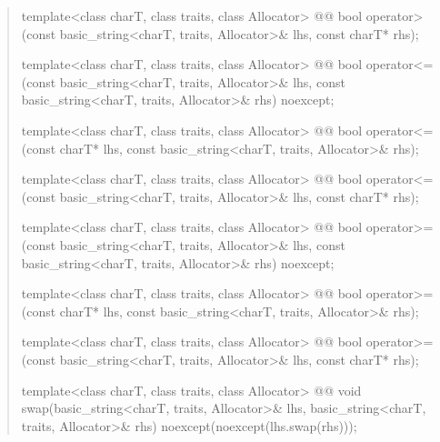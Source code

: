 \documentclass{wg21}
\begin{document}
\begin{quote}
\begin{itemdecl}
template<class charT, class traits, class Allocator>
  @@
  bool operator>(const basic_string<charT, traits, Allocator>& lhs, const charT* rhs);
\end{itemdecl}

\begin{itemdecl}
template<class charT, class traits, class Allocator>
  @@
  bool operator<=(const basic_string<charT, traits, Allocator>& lhs,
                  const basic_string<charT, traits, Allocator>& rhs) noexcept;
\end{itemdecl}

\begin{itemdecl}
template<class charT, class traits, class Allocator>
  @@
  bool operator<=(const charT* lhs, const basic_string<charT, traits, Allocator>& rhs);
\end{itemdecl}

\begin{itemdecl}
template<class charT, class traits, class Allocator>
  @@
  bool operator<=(const basic_string<charT, traits, Allocator>& lhs, const charT* rhs);
\end{itemdecl}

\begin{itemdecl}
template<class charT, class traits, class Allocator>
  @@
  bool operator>=(const basic_string<charT, traits, Allocator>& lhs,
                  const basic_string<charT, traits, Allocator>& rhs) noexcept;
\end{itemdecl}

\begin{itemdecl}
template<class charT, class traits, class Allocator>
  @@
  bool operator>=(const charT* lhs, const basic_string<charT, traits, Allocator>& rhs);
\end{itemdecl}

\begin{itemdecl}
template<class charT, class traits, class Allocator>
  @@
  bool operator>=(const basic_string<charT, traits, Allocator>& lhs, const charT* rhs);
\end{itemdecl}

\begin{itemdecl}
template<class charT, class traits, class Allocator>
  @@
  void swap(basic_string<charT, traits, Allocator>& lhs,
            basic_string<charT, traits, Allocator>& rhs)
    noexcept(noexcept(lhs.swap(rhs)));
\end{itemdecl}
\end{quote}
\end{document}
